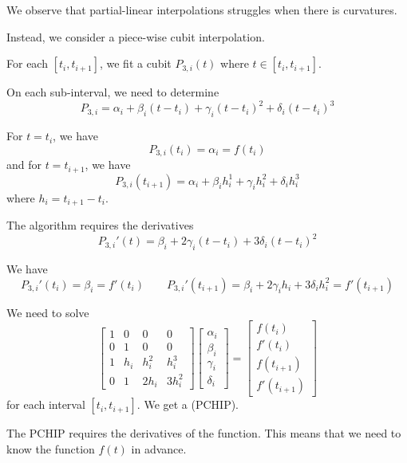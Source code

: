 We observe that partial-linear interpolations struggles when there is curvatures.

Instead, we consider a piece-wise cubit interpolation.

For each \( [t_i, t_{i+1}] \), we fit a cubit \( P_{3,i}(t) \) where \( t \in [t_i, t_{i+1}] \).

On each sub-interval, we need to determine \[
    P_{3,i} = \alpha_i + \beta_i(t - t_i) + \gamma_i(t - t_i)^2 + \delta_i(t - t_i)^3
\]

For \( t = t_i \), we have \[
    P_{3,i}(t_i) = \alpha_i = f(t_i)
\] and for \( t = t_{i+1} \), we have \[
    P_{3,i}(t_{i+1}) = \alpha_i + \beta_i h_i^1 + \gamma_i h_i^2 + \delta_i h_i^3
\] where \( h_i = t_{i+1} - t_i \).

\begin{remark}
    The algorithm requires the derivatives \[
        P_{3,i}'(t) = \beta_i + 2\gamma_i(t - t_i) + 3\delta_i(t - t_i)^2
    \]

    We have \[
        P_{3,i}'(t_i) = \beta_i = f'(t_i)
        \qquad
        P_{3,i}'(t_{i+1}) = \beta_i + 2\gamma_i h_i + 3\delta_i h_i^2 = f'(t_{i+1})
    \]
\end{remark}

We need to solve \[
    \begin{bmatrix}
        1 & 0   & 0     & 0      \\
        0 & 1   & 0     & 0      \\
        1 & h_i & h_i^2 & h_i^3  \\
        0 & 1   & 2h_i  & 3h_i^2
    \end{bmatrix} \begin{bmatrix}
        \alpha_i \\ \beta_i \\ \gamma_i \\ \delta_i
    \end{bmatrix} = \begin{bmatrix}
        f(t_i) \\ f'(t_i) \\ f(t_{i+1}) \\ f'(t_{i+1})
    \end{bmatrix}
\] for each interval \( [t_i, t_{i+1}] \). We get a  (PCHIP).

\begin{remark}[Caveat]
    The PCHIP requires the derivatives of the function. This means that we need to know the function \( f(t) \) in advance.
\end{remark}

